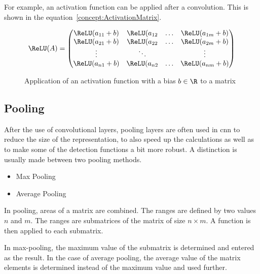 {For example, an activation function can be applied after a convolution. This is shown in the equation~\ref{concept:ActivationMatrix}.


    \begin{figure}
    
    $$
      \ReLU(A) 
      = 
      \left(
        \begin{matrix}
          \ReLU(a_{11}+b) & \ReLU(a_{12} & \ldots & \ReLU(a_{1m}+b)\\
          \ReLU(a_{21}+b) & \ReLU(a_{22} & \ldots & \ReLU(a_{2m}+b)\\
             \vdots       & \ddots       &        &   \vdots \\
          \ReLU(a_{n1}+b) & \ReLU(a_{n2} & \ldots & \ReLU(a_{nm}+b)\\
    \end{matrix}
    \right)
    $$
    
    \caption{Application of an activation function with a bias $b \in \R$ to a matrix}\label{concept:AktivierungMatrix}
    
\end{figure}





\subsection{Pooling}


After the use of convolutional layers, pooling layers are often used in \ac{cnn} to reduce the size of the representation, to also speed up the calculations as well as to make some of the detection functions a bit more robust. A distinction is usually made between two pooling methods.

\begin{itemize}
  \item Max Pooling
  \item Average Pooling
\end{itemize}

In pooling, areas of a matrix are combined. The ranges are defined by two values $n$ and $m$. The ranges are submatrices of the matrix of size $n \times m$. A function is then applied to each submatrix.

In max-pooling, the maximum value of the submatrix is determined and entered as the result. In the case of average pooling, the average value of the matrix elements is determined instead of the maximum value and used further.


}
